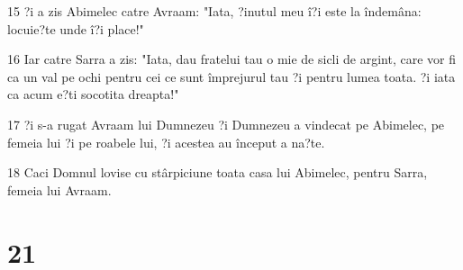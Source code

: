 \par 15 ?i a zis Abimelec catre Avraam: "Iata, ?inutul meu î?i este la îndemâna: locuie?te unde î?i place!"
\par 16 Iar catre Sarra a zis: "Iata, dau fratelui tau o mie de sicli de argint, care vor fi ca un val pe ochi pentru cei ce sunt împrejurul tau ?i pentru lumea toata. ?i iata ca acum e?ti socotita dreapta!"
\par 17 ?i s-a rugat Avraam lui Dumnezeu ?i Dumnezeu a vindecat pe Abimelec, pe femeia lui ?i pe roabele lui, ?i acestea au început a na?te.
\par 18 Caci Domnul lovise cu stârpiciune toata casa lui Abimelec, pentru Sarra, femeia lui Avraam.

\chapter{21}

